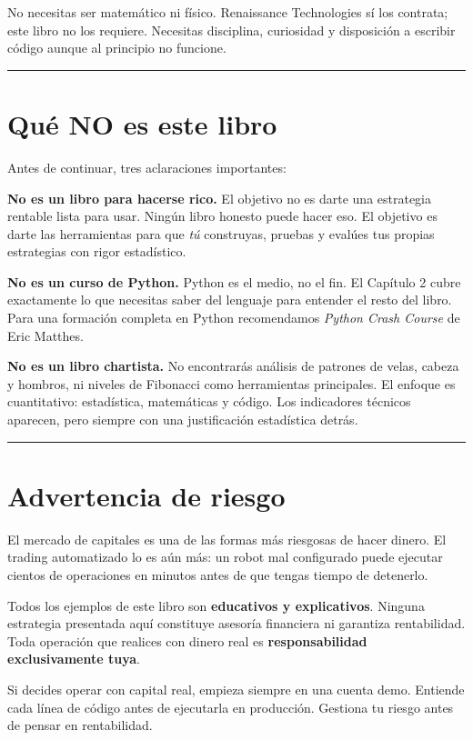 \documentclass[12pt, a4paper, twoside, openright]{book}
\renewenvironment{quote}{%
  \begin{mdframed}[style=quotestyle]%
  \itshape\color{bkblue}%
}{%
  \end{mdframed}%
}
\numberwithin{figure}{chapter}
\numberwithin{table}{chapter}
\begin{document}
No necesitas ser matemático ni físico. Renaissance Technologies sí los
contrata; este libro no los requiere. Necesitas disciplina, curiosidad y
disposición a escribir código aunque al principio no funcione.

\begin{center}\rule{0.5\linewidth}{0.5pt}\end{center}

\section{Qué NO es este libro}\label{quuxe9-no-es-este-libro}

Antes de continuar, tres aclaraciones importantes:

\textbf{No es un libro para hacerse rico.} El objetivo no es darte una
estrategia rentable lista para usar. Ningún libro honesto puede hacer
eso. El objetivo es darte las herramientas para que \emph{tú}
construyas, pruebas y evalúes tus propias estrategias con rigor
estadístico.

\textbf{No es un curso de Python.} Python es el medio, no el fin. El
Capítulo 2 cubre exactamente lo que necesitas saber del lenguaje para
entender el resto del libro. Para una formación completa en Python
recomendamos \emph{Python Crash Course} de Eric Matthes.

\textbf{No es un libro chartista.} No encontrarás análisis de patrones
de velas, cabeza y hombros, ni niveles de Fibonacci como herramientas
principales. El enfoque es cuantitativo: estadística, matemáticas y
código. Los indicadores técnicos aparecen, pero siempre con una
justificación estadística detrás.

\begin{center}\rule{0.5\linewidth}{0.5pt}\end{center}

\section{Advertencia de riesgo}\label{advertencia-de-riesgo}

\begin{quote}
El mercado de capitales es una de las formas más riesgosas de hacer
dinero. El trading automatizado lo es aún más: un robot mal configurado
puede ejecutar cientos de operaciones en minutos antes de que tengas
tiempo de detenerlo.

Todos los ejemplos de este libro son \textbf{educativos y explicativos}.
Ninguna estrategia presentada aquí constituye asesoría financiera ni
garantiza rentabilidad. Toda operación que realices con dinero real es
\textbf{responsabilidad exclusivamente tuya}.

Si decides operar con capital real, empieza siempre en una cuenta demo.
Entiende cada línea de código antes de ejecutarla en producción.
Gestiona tu riesgo antes de pensar en rentabilidad.
\end{quote}
\end{document}
